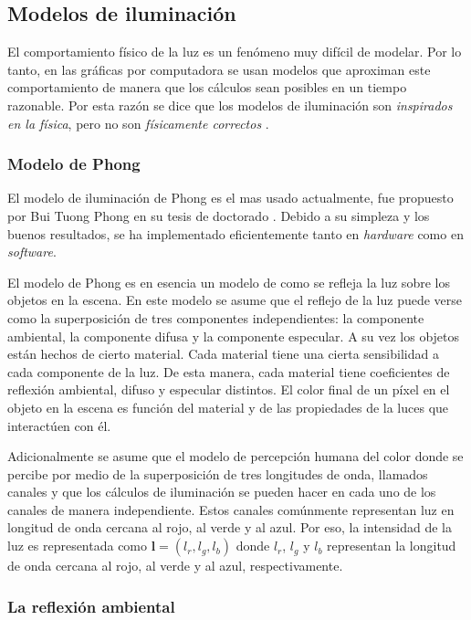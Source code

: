 \subsection{Modelos de iluminación}

El comportamiento físico de la luz es un fenómeno muy difícil de modelar. Por lo tanto, en las gráficas por computadora se usan modelos que aproximan este comportamiento de manera que los cálculos sean posibles en un tiempo razonable. Por esta razón se dice que los modelos de iluminación son \emph{inspirados en la física}, pero no son \emph{físicamente correctos} \cite{bussCG}.

\subsubsection{Modelo de Phong}

El modelo de iluminación de Phong es el mas usado actualmente, fue propuesto por Bui Tuong Phong en su tesis de doctorado \cite{Phong:Modelo}. Debido a su simpleza y los buenos resultados, se ha implementado eficientemente tanto en \emph{hardware} como en \emph{software}.

El modelo de Phong es en esencia un modelo de como se refleja la luz sobre los objetos en la escena. En este modelo se asume que el reflejo de la luz puede verse como la superposición de tres componentes independientes: la componente ambiental, la componente difusa y la componente especular. A su vez los objetos están hechos de cierto material. Cada material tiene una cierta sensibilidad a cada componente de la luz. De esta manera, cada material tiene coeficientes de reflexión ambiental, difuso y especular distintos. El color final de un píxel en el objeto en la escena es función del material y de las propiedades de la luces que interactúen con él.

Adicionalmente se asume que el modelo de percepción humana del color donde se percibe por medio de la superposición de tres longitudes de onda, llamados canales y que los cálculos de iluminación se pueden hacer en cada uno de los canales de manera independiente. Estos canales comúnmente representan luz en longitud de onda cercana al rojo, al verde y al azul. Por eso, la intensidad de la luz es representada como $\textbf{l} = (l_r, l_g, l_b)$ donde $l_r$,  $l_g$ y $l_b$ representan la longitud de onda cercana al rojo, al verde y al azul, respectivamente.

\subsubsection{La reflexión ambiental}


